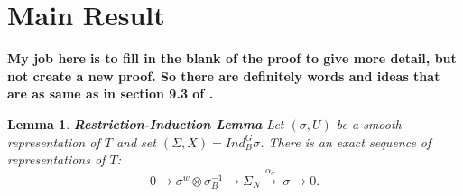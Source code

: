 \documentclass[12pt,a4paper,english]{article}
\theoremstyle{plain}
\newtheorem{lem}[thm]{Lemma}
\theoremstyle{definition}
\begin{document}
\section{Main Result}
\textbf{My job here is to fill in the blank of the proof to give more detail, but not create a new proof. So there are definitely words and ideas that are as same as in section 9.3 of \cite{bushnell2006local}.}
\begin{lem}
\textbf{Restriction-Induction Lemma}\cite{bushnell2006local} Let $(\sigma, U)$ be a smooth representation of $T$ and set $(\Sigma, X)=Ind^{G}_{B}\sigma$. There is an exact sequence of representations of $T$:
\begin{equation}
    0\rightarrow \sigma^{w}\otimes \sigma^{-1}_{B} \rightarrow \Sigma_{N}\xrightarrow{\alpha_{\sigma}}\ \sigma \rightarrow 0.
\end{equation}
\end{lem}
\end{document}
